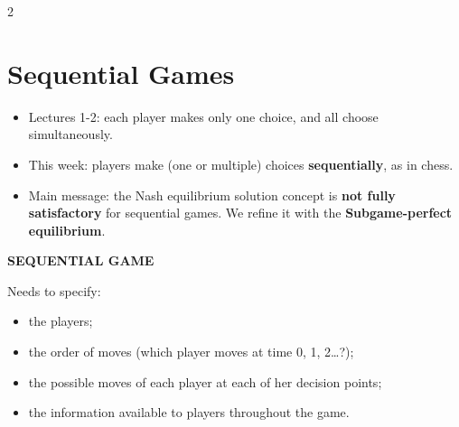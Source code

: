 \documentclass[a4paper,9pt]{extarticle}
\begin{document}

\thispagestyle{fancy}



\begin{multicols}{2}



\section{Sequential Games}


\begin{important}

\begin{itemize}

\item Lectures 1-2: each player makes only one choice, and all choose simultaneously.

\item This week: players make (one or multiple) choices \textbf{sequentially}, as in chess.

\item Main message: the Nash equilibrium solution concept is \textbf{not fully satisfactory}
for sequential games. We refine it with the \textbf{Subgame-perfect equilibrium}.

\end{itemize}

\end{important}


\begin{definition}

\textbf{SEQUENTIAL GAME}

Needs to specify:

\begin{itemize}

\item the players;

\item the order of moves (which player moves at time 0, 1, 2\dots?);

\item the possible moves of each player at each of her decision points;

\item the information available to players throughout the game.

\end{itemize}

\end{definition}



\end{multicols}
\end{document}
